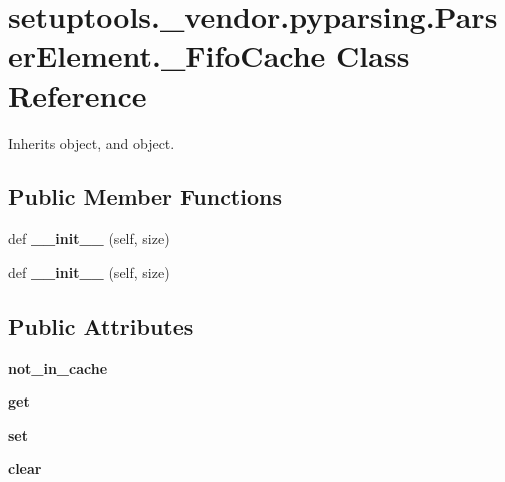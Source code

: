 \hypertarget{classsetuptools_1_1__vendor_1_1pyparsing_1_1_parser_element_1_1___fifo_cache}{}\section{setuptools.\+\_\+vendor.\+pyparsing.\+Parser\+Element.\+\_\+\+Fifo\+Cache Class Reference}
\label{classsetuptools_1_1__vendor_1_1pyparsing_1_1_parser_element_1_1___fifo_cache}


Inherits object, and object.

\subsection*{Public Member Functions}
\begin{DoxyCompactItemize}
\item 
\mbox{\label{classsetuptools_1_1__vendor_1_1pyparsing_1_1_parser_element_1_1___fifo_cache_a40f2fcec03b02f33944ad32a2d81ff95}} 
def {\bfseries \+\_\+\+\_\+init\+\_\+\+\_\+} (self, size)
\item 
\mbox{\label{classsetuptools_1_1__vendor_1_1pyparsing_1_1_parser_element_1_1___fifo_cache_a40f2fcec03b02f33944ad32a2d81ff95}} 
def {\bfseries \+\_\+\+\_\+init\+\_\+\+\_\+} (self, size)
\end{DoxyCompactItemize}
\subsection*{Public Attributes}
\begin{DoxyCompactItemize}
\item 
\mbox{\label{classsetuptools_1_1__vendor_1_1pyparsing_1_1_parser_element_1_1___fifo_cache_a6ad6e600753fcf4433ddb58880871a6c}} 
{\bfseries not\+\_\+in\+\_\+cache}
\item 
\mbox{\label{classsetuptools_1_1__vendor_1_1pyparsing_1_1_parser_element_1_1___fifo_cache_a9ae5a515cfe7696c70831975e6323fd5}} 
{\bfseries get}
\item 
\mbox{\label{classsetuptools_1_1__vendor_1_1pyparsing_1_1_parser_element_1_1___fifo_cache_a3fe4dabe4d58c31cad7b39dc4c9978c5}} 
{\bfseries set}
\item 
\mbox{\label{classsetuptools_1_1__vendor_1_1pyparsing_1_1_parser_element_1_1___fifo_cache_a6289536e60db16245ece5c22e77e033d}} 
{\bfseries clear}
\end{DoxyCompactItemize}


